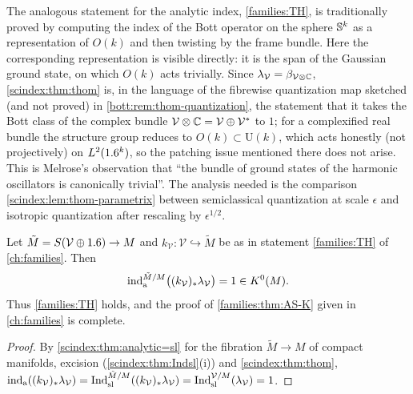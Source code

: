 \begin{remark}\label{scindex:rem:why-trivial}
  The analogous statement for the analytic index, \ref{families:TH}, is
  traditionally proved by computing the index of the Bott operator on the sphere
  $\mathbb{S}^k$ as a representation of $O(k)$ and then twisting by the frame bundle.
  Here the corresponding representation is visible directly: it is the span of the
  Gaussian ground state, on which $O(k)$ acts trivially. Since
  $\lambda_{\mathcal V}=\beta_{\mathcal V\otimes\mathbb{C}}$, \cref{scindex:thm:thom} is, in
  the language of the fibrewise quantization map sketched (and not proved) in
  \cref{bott:rem:thom-quantization}, the statement that it takes the Bott class of
  the complex bundle
  $\mathcal V\otimes\mathbb{C}=\mathcal V\oplus\mathcal V^*$ to $1$; for a complexified real
  bundle the structure group reduces to $O(k)\subset\mathrm U(k)$, which acts
  honestly (not projectively) on $L^2(1.6^k)$, so the patching issue mentioned there
  does not arise. This is Melrose's
  observation that ``the bundle of ground states of the harmonic oscillators is
  canonically trivial''. The analysis needed is the comparison
  \cref{scindex:lem:thom-parametrix} between semiclassical quantization at scale
  $\epsilon$ and isotropic quantization after rescaling by $\epsilon^{1/2}$.
\end{remark}

\begin{corollary}\label{scindex:cor:TH}
  Let $\tilde M=S(\mathcal V\oplus1.6)\to M$ and $k_{\mathcal V}:\mathcal V
  \hookrightarrow\tilde M$ be as in statement \ref{families:TH} of \cref{ch:families}. Then
  \begin{equation*}
    \operatorname{ind}_{\mathrm{a}}^{\tilde M/M}\bigl((k_{\mathcal V})_*\lambda_{\mathcal V}\bigr)=1\in
    K^0(M).
  \end{equation*}
  Thus \ref{families:TH} holds, and the proof of \cref{families:thm:AS-K} given in
  \cref{ch:families} is complete.
\end{corollary}
\begin{proof}
  By \cref{scindex:thm:analytic=sl} for the fibration $\tilde M\to M$ of compact
  manifolds, excision (\cref{scindex:thm:Indsl}(i)) and \cref{scindex:thm:thom},
  $\operatorname{ind}_{\mathrm{a}}((k_{\mathcal V})_*\lambda_{\mathcal V})=\operatorname{Ind}^{\tilde M/M}_{\mathrm{sl}}
  ((k_{\mathcal V})_*\lambda_{\mathcal V})=\operatorname{Ind}^{\mathcal V/M}_{\mathrm{sl}}
  (\lambda_{\mathcal V})=1$.
\end{proof}

